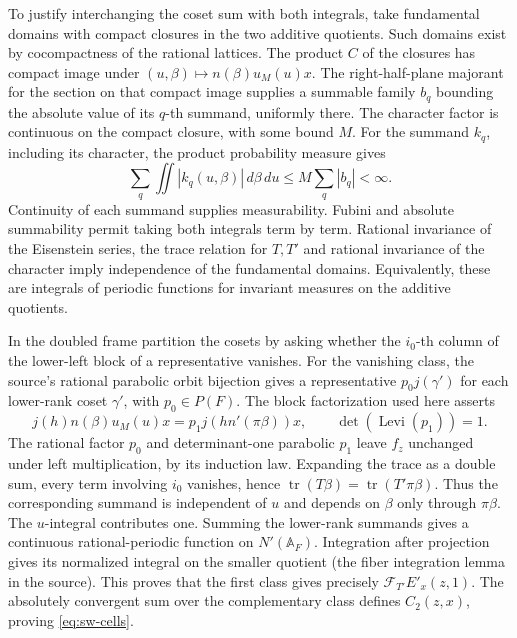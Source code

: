 To justify interchanging the coset sum with both integrals, take
fundamental domains with compact closures in the two additive
quotients. Such domains exist by cocompactness of the rational
lattices. The product \(C\) of the closures has compact image
under \((u,\beta)\mapsto n(\beta)u_M(u)x\). The right-half-plane
majorant for the section on that compact image supplies a summable
family \(b_q\) bounding the absolute value of its \(q\)-th summand,
uniformly there. The character factor is continuous on the compact
closure, with some bound \(M\). For the summand \(k_q\), including
its character, the product probability measure gives
\[
   \sum_q\iint |k_q(u,\beta)|\,d\beta\,du
                  \leq M\sum_q |b_q|<\infty .
\]
Continuity of each summand supplies measurability. Fubini and absolute
summability permit taking both integrals term by term. Rational
invariance of the Eisenstein series, the trace relation for \(T,T'\)
and rational invariance of the character imply independence of
the fundamental domains. Equivalently, these are integrals of
periodic functions for invariant measures on the additive quotients.

In the doubled frame partition the cosets by asking whether the
\(i_0\)-th column of the lower-left block of a representative
vanishes. For the vanishing class, the source's rational parabolic
orbit bijection gives a representative \(p_0j(\gamma')\) for each
lower-rank coset \(\gamma'\), with \(p_0\in P(F)\). The block
factorization used here asserts
\[
 j(h)n(\beta)u_M(u)x
  =p_1j(hn'(\pi\beta))x,\qquad
             \det(\operatorname{Levi}(p_1))=1 .
\]
The rational factor \(p_0\) and determinant-one parabolic \(p_1\)
leave \(f_z\) unchanged under left multiplication, by its
induction law. Expanding the trace as a double sum, every term
involving \(i_0\) vanishes, hence
\(\operatorname{tr}(T\beta)=\operatorname{tr}(T'\pi\beta)\).
Thus the corresponding summand is independent of \(u\) and
depends on \(\beta\) only through \(\pi\beta\). The \(u\)-integral
contributes one. Summing the lower-rank summands gives a continuous
rational-periodic function on \(N'(\mathbb A_F)\). Integration after
projection gives its normalized integral on the smaller quotient
(the fiber integration lemma in the source). This proves that the
first class gives precisely \(\mathcal F_{T'}E'_x(z,1)\).
The absolutely convergent sum over the complementary class defines
\(C_2(z,x)\), proving \eqref{eq:sw-cells}.

